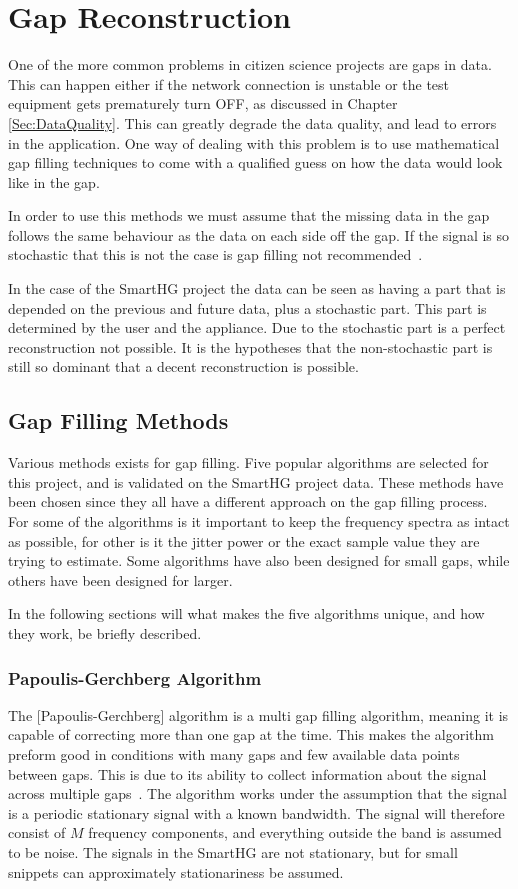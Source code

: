 \chapter{Gap Reconstruction}
\label{Sec:GapFill}
One of the more common problems in citizen science projects are gaps in data. This can happen either if the network connection is unstable or the test equipment gets prematurely turn OFF, as discussed in Chapter \ref{Sec:DataQuality}. This can greatly degrade the data quality, and lead to errors in the application. One way of dealing with this problem is to use mathematical gap filling techniques to come with a qualified guess on how the data would look like in the gap. 

In order to use this methods we must assume that the missing data in the gap follows the same behaviour as the data on each side off the gap. If the signal is so stochastic that this is not the case is gap filling not recommended~\citep{RefWorks:10}. 

In the case of the SmartHG project the data can be seen as having a part that is depended on the previous and future data, plus a stochastic part. This part is determined by the user and the appliance. Due to the stochastic part is a perfect reconstruction not possible. It is the hypotheses that the non-stochastic part is still so dominant that a decent reconstruction is possible.

\section{Gap Filling Methods}
\label{T:GapFilling}
Various methods exists for gap filling. Five popular algorithms are selected for this project, and is validated on the SmartHG project data. These methods have been chosen since they all have a different approach on the gap filling process. For some of the algorithms is it important to keep the frequency spectra as intact as possible, for other is it the jitter power or the exact sample value they are trying to estimate. Some algorithms have also been designed for small gaps, while others have been designed for larger. 

In the following sections will what makes the five algorithms unique, and how they work, be briefly described.

\subsection{Papoulis-Gerchberg Algorithm}
\label{T:PGA}
The [Papoulis-Gerchberg] algorithm is a multi gap filling algorithm, meaning it is capable of correcting more than one gap at the time. This makes the algorithm preform good in conditions with many gaps and few available data points between gaps. This is due to its ability to collect information about the signal across multiple gaps~\citep{RefWorks:11}. The  algorithm works under the assumption that the signal is a periodic stationary signal with a known bandwidth. The signal will therefore consist of $M$ frequency components, and everything outside the band is assumed to be noise. The signals in the SmartHG are not stationary, but for small snippets can approximately stationariness be assumed. 

